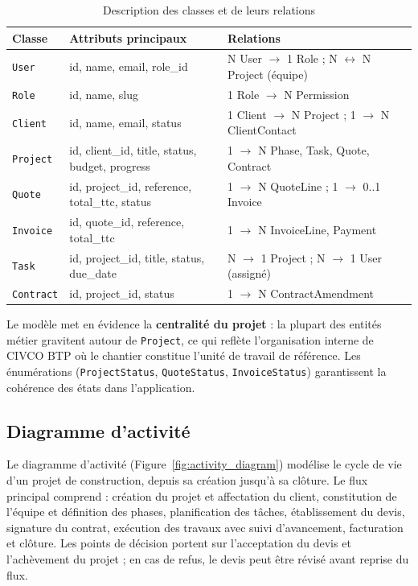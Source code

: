 \begin{table}[H]
\caption{Description des classes et de leurs relations}
\label{tab:classes}
\centering
\small
\begin{tabular}{|l|p{4.8cm}|p{5.2cm}|}
\hline
\textbf{Classe} & \textbf{Attributs principaux} & \textbf{Relations} \\
\hline
\texttt{User} & id, name, email, role\_id & N User $\rightarrow$ 1 Role ;
N $\leftrightarrow$ N Project (équipe) \\
\hline
\texttt{Role} & id, name, slug & 1 Role $\rightarrow$ N Permission \\
\hline
\texttt{Client} & id, name, email, status & 1 Client $\rightarrow$ N Project ;
1 $\rightarrow$ N ClientContact \\
\hline
\texttt{Project} & id, client\_id, title, status, budget, progress & 1 $\rightarrow$ N Phase,
Task, Quote, Contract \\
\hline
\texttt{Quote} & id, project\_id, reference, total\_ttc, status & 1 $\rightarrow$ N QuoteLine ;
1 $\rightarrow$ 0..1 Invoice \\
\hline
\texttt{Invoice} & id, quote\_id, reference, total\_ttc & 1 $\rightarrow$ N InvoiceLine,
Payment \\
\hline
\texttt{Task} & id, project\_id, title, status, due\_date & N $\rightarrow$ 1 Project ;
N $\rightarrow$ 1 User (assigné) \\
\hline
\texttt{Contract} & id, project\_id, status & 1 $\rightarrow$ N ContractAmendment \\
\hline
\end{tabular}
\end{table}

\medskip

Le modèle met en évidence la \textbf{centralité du projet} : la plupart des entités
métier gravitent autour de \texttt{Project}, ce qui reflète l'organisation interne
de CIVCO BTP où le chantier constitue l'unité de travail de référence. Les
énumérations (\texttt{ProjectStatus}, \texttt{QuoteStatus}, \texttt{InvoiceStatus})
garantissent la cohérence des états dans l'application.

\subsection{Diagramme d'activité}

Le diagramme d'activité (Figure~\ref{fig:activity_diagram}) modélise le cycle de vie d'un projet de construction, depuis
sa création jusqu'à sa clôture. Le flux principal comprend : création du projet et
affectation du client, constitution de l'équipe et définition des phases, planification
des tâches, établissement du devis, signature du contrat, exécution des travaux avec
suivi d'avancement, facturation et clôture. Les points de décision portent sur
l'acceptation du devis et l'achèvement du projet ; en cas de refus, le devis peut
être révisé avant reprise du flux.


